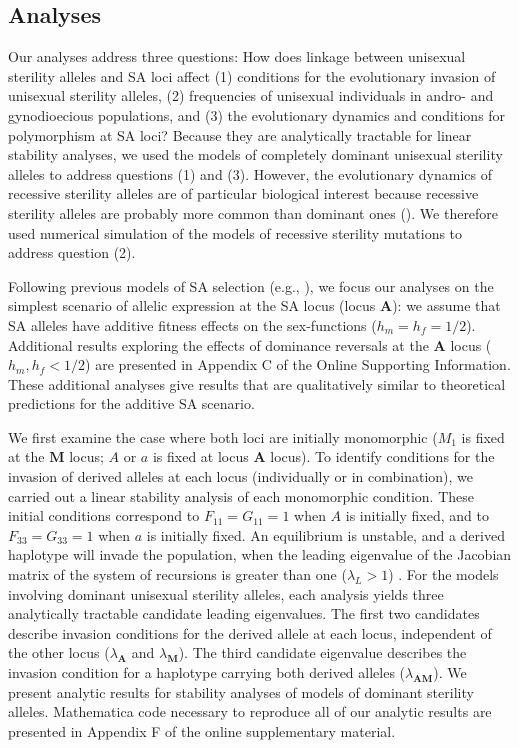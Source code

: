 \documentclass{article}
\begin{document}
\subsection*{Analyses} \label{subsec:analyses}

Our analyses address three questions: How does linkage between unisexual sterility alleles and SA loci affect (1) conditions for the evolutionary invasion of unisexual sterility alleles, (2) frequencies of unisexual individuals in andro- and gynodioecious populations, and (3) the evolutionary dynamics and conditions for polymorphism at SA loci? Because they are analytically tractable for linear stability analyses, we used the models of completely dominant unisexual sterility alleles to address questions (1) and (3). However, the evolutionary dynamics of recessive sterility alleles are of particular biological interest because recessive sterility alleles are probably more common than dominant ones (\citealt{Charlesworth1978a}). We therefore used numerical simulation of the models of recessive sterility mutations to address question (2). 

Following previous models of SA selection (e.g., \citealp{Kidwell1977, Prout2000, JordanConnallon2014}), we focus our analyses on the simplest scenario of allelic expression at the SA locus (locus $\mathbf{A}$): we assume that SA alleles have additive fitness effects on the sex-functions ($h_m = h_f = 1/2$). Additional results exploring the effects of dominance reversals at the $\mathbf{A}$ locus ($h_m, h_f < 1/2$) are presented in Appendix C of the Online Supporting Information. These additional analyses give results that are qualitatively similar to theoretical predictions for the additive SA scenario.

We first examine the case where both loci are initially monomorphic ($M_1$ is fixed at the $\mathbf{M}$ locus; $A$ or $a$ is fixed at locus $\mathbf{A}$ locus). To identify conditions for the invasion of derived alleles at each locus (individually or in combination), we carried out a linear stability analysis of each monomorphic condition. These initial conditions correspond to $F_{11} = G_{11} = 1$ when $A$ is initially fixed, and to $F_{33} = G_{33} = 1$ when $a$ is initially fixed. An equilibrium is unstable, and a derived haplotype will invade the population, when the leading eigenvalue of the Jacobian matrix of the system of recursions is greater than one ($\lambda_L > 1$) \citep{OttoDay2007}. For the models involving dominant unisexual sterility alleles, each analysis yields three analytically tractable candidate leading eigenvalues. The first two candidates describe invasion conditions for the derived allele at each locus, independent of the other locus ($\lambda_\mathbf{A}$ and $\lambda_\mathbf{M}$). The third candidate eigenvalue describes the invasion condition for a haplotype carrying both derived alleles ($\lambda_\mathbf{AM}$). We present analytic results for stability analyses of models of dominant sterility alleles. Mathematica code necessary to reproduce all of our analytic results are presented in Appendix F of the online supplementary material.
\end{document}
